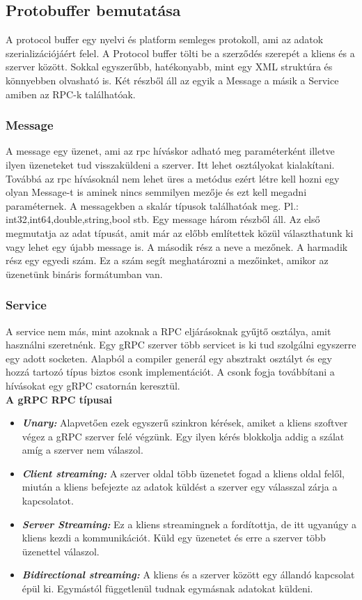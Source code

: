 \documentclass[
]{thesis-ekf}
\theoremstyle{definition}
\theoremstyle{remark}
\begin{document}
\subsection{Protobuffer bemutatása}
A protocol buffer egy nyelvi és platform semleges protokoll, ami az adatok szerializációjáért felel. A Protocol buffer tölti be a szerződés szerepét a kliens és a szerver között. Sokkal egyszerűbb, hatékonyabb, mint egy XML struktúra és könnyebben olvasható is. Két részből áll az egyik a Message a másik a Service amiben az RPC-k találhatóak. 
\subsubsection{Message}
A message egy üzenet, ami az rpc híváskor adható meg paraméterként illetve ilyen üzeneteket tud visszaküldeni a szerver. Itt lehet osztályokat kialakítani. Továbbá az rpc hívásoknál nem lehet üres a metódus ezért létre kell hozni egy olyan Message-t is aminek nincs semmilyen mezője és ezt kell megadni paraméternek. A messagekben a skalár típusok találhatóak meg. Pl.: int32,int64,double,string,bool stb. Egy message három részből áll. Az első megmutatja az adat típusát, amit már az előbb említettek közül választhatunk ki vagy lehet egy újabb message is. A második rész a neve a mezőnek. A harmadik rész egy egyedi szám. Ez a szám segít meghatározni a mezőinket, amikor az üzenetünk bináris formátumban van.
\subsubsection{Service}
A service nem más, mint azoknak a RPC eljárásoknak gyűjtő osztálya, amit használni szeretnénk. Egy gRPC szerver több servicet is ki tud szolgálni egyszerre egy adott socketen. Alapból a compiler generál egy absztrakt osztályt és egy hozzá tartozó típus biztos csonk implementációt. A csonk fogja továbbítani a hívásokat egy gRPC csatornán keresztül.\\\textbf{A gRPC RPC típusai}
\begin{itemize}[leftmargin=0pt]
	\item[] \textit{\textbf{Unary: }}Alapvetően ezek egyszerű szinkron kérések, amiket a kliens szoftver végez a gRPC szerver felé végzünk. Egy ilyen kérés blokkolja addig a szálat amíg a szerver nem válaszol. 
	\item[] \textit{\textbf{Client streaming:  }}A szerver oldal több üzenetet fogad a kliens oldal felől, miután a kliens befejezte az adatok küldést a szerver egy válasszal zárja a kapcsolatot.
	\item[] \textit{\textbf{Server Streaming: }}Ez a kliens streamingnek a fordítottja, de itt ugyanúgy a kliens kezdi a kommunikációt. Küld egy üzenetet és erre a szerver több üzenettel válaszol. 
	\item[] \textit{\textbf{Bidirectional streaming: }}A kliens és a szerver között egy állandó kapcsolat épül ki. Egymástól függetlenül tudnak egymásnak adatokat küldeni. 
\end{itemize}
\end{document}
